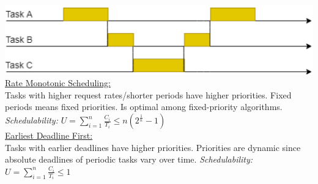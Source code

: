 \includegraphics[width=\columnwidth]{images/preemption.png}
\underline{Rate Monotonic Scheduling:}\\
Tasks with higher request rates/shorter periods have higher priorities.
Fixed periods means fixed priorities. Is optimal among fixed-priority algorithms.
\textit{Schedulability:} $U=\sum_{i=1}^{n} \frac{C_i}{T_i} \leq n(2^{\frac{1}{n}}-1)$\\
\underline{Earliest Deadline First:}\\
Tasks with earlier deadlines have higher priorities.
Priorities are dynamic since absolute deadlines of periodic tasks vary over time.
\textit{Schedulability:} $U=\sum_{i=1}^{n} \frac{C_i}{T_i} \leq 1$\\
